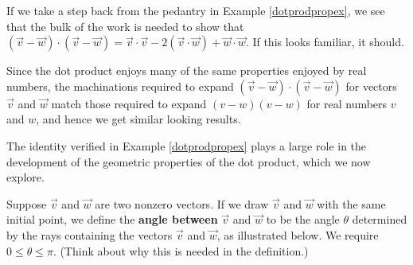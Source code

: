 \documentclass{ximera}
\begin{document}
If we take a step back from the pedantry in Example \ref{dotprodpropex}, we see that the bulk of the work is needed to show that $(\vec{v} - \vec{w}) \cdot (\vec{v} - \vec{w})  = \vec{v} \cdot \vec{v} -2(\vec{v} \cdot \vec{w}) + \vec{w}\cdot\vec{w}$.  If this looks familiar, it should. 

\smallskip

Since the dot product enjoys many of the same properties enjoyed by real numbers,  the machinations required to expand  $(\vec{v} - \vec{w}) \cdot (\vec{v} - \vec{w})$ for vectors $\vec{v}$ and $\vec{w}$ match those required to expand $(v-w)(v-w)$ for real numbers $v$ and $w$, and hence we get similar looking results.  

\smallskip

The identity verified in Example \ref{dotprodpropex} plays a large role in the development of the geometric properties of the dot product, which we now explore.

\smallskip

Suppose $\vec{v}$ and $\vec{w}$ are two nonzero vectors.  If we draw $\vec{v}$ and $\vec{w}$ with the same initial point, we define the \textbf{angle between} $\vec{v}$ and $\vec{w}$ to be the angle $\theta$ determined by the rays containing the vectors $\vec{v}$ and $\vec{w}$, as illustrated below.  We require $0 \leq \theta \leq \pi$.  (Think about why this is needed in the definition.)
\end{document}
